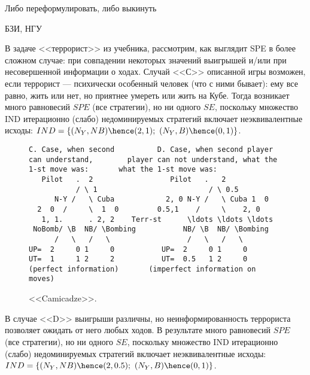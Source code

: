 \begin{problem}{\red Либо переформулировать, либо выкинуть}
\begin{source}
БЗИ, НГУ
\end{source}
 {\rm В задаче <<террорист>> из учебника,
рассмотрим, как выглядит SPE в более сложном случае: при
совпадении некоторых значений выигрышей и/или при
несовершенной информации о ходах. Случай <<С>> описанной
игры возможен, если террорист --- психически особенный
человек (что с ними бывает): ему все равно, жить или нет,
но приятнее умереть или жить на Кубе. Тогда возникает много
равновесий $SPE$ (все стратегии), но ни одного $SE$,
поскольку множество IND итерационно (слабо) недоминируемых
стратегий включает неэквивалентные исходы: $IND=\{
(N_Y,NB)\hence (2,1);~ (N_Y,B)\hence (0,1)\}$.

\begin{figure}[h]

\begin{verbatim}
C. Case, when second          D. Case, when second player
can understand,        player can not understand, what the
1-st move was:       what the 1-st move was:
   Pilot   .  2                  Pilot   .   2
           / \ 1                          / \ 0.5
      N-Y /   \ Cuba            2, 0 N-Y /   \ Cuba 1  0
  2  0  /     \  1  0         0.5,1    /     \    2, 0
   1, 1.      . 2, 2    Terr-st      \ldots \ldots \ldots
 NoBomb/ \B  NB/ \Bombing           NB/ \B  NB/ \Bombing
      /   \   /   \                  /   \   /   \
UP=  2     0 1     0           UP=  2     0 1     0
UT=  1     1 2     2           UT=  0.5   1 2     0
(perfect information)       (imperfect information on moves)
\end{verbatim}

\caption{<<Camicadze>>.}
\end{figure}

В случае <<D>> выигрыши различны, но неинформированность
террориста позволяет ожидать от него любых ходов. В
результате много равновесий $SPE$ (все стратегии), но ни
одного $SE$, поскольку множество IND итерационно (слабо)
недоминируемых стратегий включает неэквивалентные исходы:
$IND=\{ (N_Y,NB)\hence (2,0.5);~ (N_Y,B)\hence (0,1)\}$.}






\begin{sol}

\end{sol}
\end{problem}




















